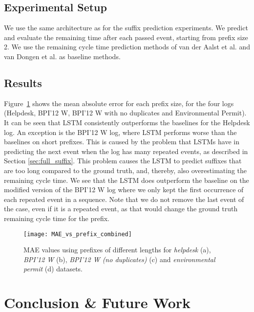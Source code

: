 \documentclass[runningheads,a4paper]{llncs}
\begin{document}
\subsection{Experimental Setup}
We use the same architecture as for the suffix prediction experiments. We predict and evaluate the remaining time after each passed event, starting from prefix size 2. We use the remaining cycle time prediction methods of van der Aalst et al. \cite{Aalst2011} and van Dongen et al. \cite{Dongen2008} as baseline methods. 

\subsection{Results}
Figure~\ref{fig:MaeRemainingTime} shows the mean absolute error for each prefix size, for the four logs (Helpdesk, BPI'12 W, BPI'12 W with no duplicates and Environmental Permit). It can be seen that LSTM consistently outperforms the baselines for the Helpdesk log. An exception is the BPI'12 W log, where LSTM performs worse than the baselines on short prefixes. This is caused by the problem that LSTMs have in predicting the next event when the log has many repeated events, as described in Section \ref{sec:full_suffix}. This problem causes the LSTM to predict suffixes that are too long compared to the ground truth, and, thereby, also overestimating the remaining cycle time. We see that the LSTM does outperform the baseline on the modified version of the BPI'12 W log where we only kept the first occurrence of each repeated event in a sequence. Note that we do not remove the last event of the case, even if it is a repeated event, as that would change the ground truth remaining cycle time for the prefix.
\begin{figure}[hbtp]\vspace*{-2mm}
	\centering
	\texttt{[image: MAE\_vs\_prefix\_combined]}
	\caption{MAE values using prefixes of different lengths for \textit{helpdesk} (a), \textit{BPI'12 W} (b), \textit{BPI'12 W (no duplicates)} (c) and \textit{environmental permit} (d) datasets.}
	\label{fig:MaeRemainingTime}
\vspace*{-4mm}
\end{figure}





 
\section{Conclusion \& Future Work}
\label{sec:conclusion_future_work}
\end{document}

